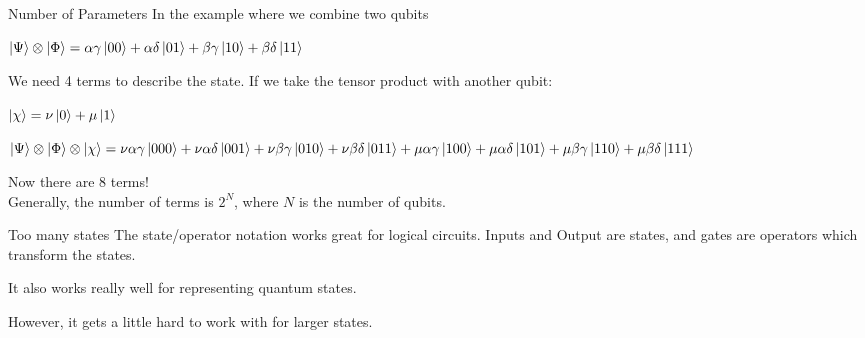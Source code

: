 \documentclass{beamer}
\begin{document}
\begin{frame}{Number of Parameters}
    In the example where we combine two qubits\vfill
    \begin{center}
        \begin{math}
            \ket{\Psi} \otimes \ket{\Phi} = \alpha\gamma\ket{00} + \alpha\delta\ket{01} + \beta\gamma\ket{10} + \beta\delta\ket{11}
        \end{math}
    \end{center}
    \vfill
    We need 4 terms to describe the state. If we take the tensor product with another qubit:\vfill
    \pause
    \begin{center}
        \begin{math}    
            \ket{\chi} = \nu\ket{0} + \mu\ket{1}
        \end{math}
    \end{center}
    \vfill
    \begin{center}
        \pause
        \begin{math}
            \ket{\Psi} \otimes \ket{\Phi} \otimes \ket{\chi} = \nu\alpha\gamma\ket{000} + \nu\alpha\delta\ket{001} + \nu\beta\gamma\ket{010} + \nu\beta\delta\ket{011} + \mu\alpha\gamma\ket{100} + \mu\alpha\delta\ket{101} + \mu\beta\gamma\ket{110} + \mu\beta\delta\ket{111}
        \end{math}
    \end{center}
    \vfill
    \pause
    Now there are 8 terms!\\
    Generally, the number of terms is $2^N$, where $N$ is the number of qubits.
\end{frame}

\begin{frame}{Too many states}
    The state/operator notation works great for logical circuits. Inputs and Output are states, and gates are operators which transform the states.\vfill

    It also works really well for representing quantum states.\vfill

    However, it gets a little hard to work with for larger states.
\end{frame}
\end{document}
